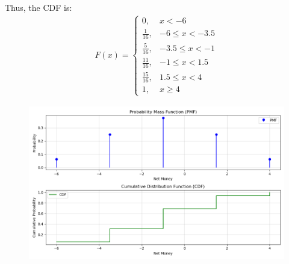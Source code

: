 \documentclass[journal]{IEEEtran}
\numberwithin{equation}{enumi}
\numberwithin{figure}{enumi}
\begin{document}
Thus, the CDF is:
\begin{align}
F(x) =
\begin{cases}
0, & x < -6 \\
\frac{1}{16}, & -6 \leq x < -3.5 \\
\frac{5}{16}, & -3.5 \leq x < -1 \\
\frac{11}{16}, & -1 \leq x < 1.5 \\
\frac{15}{16}, & 1.5 \leq x < 4 \\
1, & x \geq 4
\end{cases}
\end{align}

\begin{figure}[h!]
   \centering
   \includegraphics[width=0.7\linewidth]{figs/Figure_1.png}
\end{figure}
\end{document}

